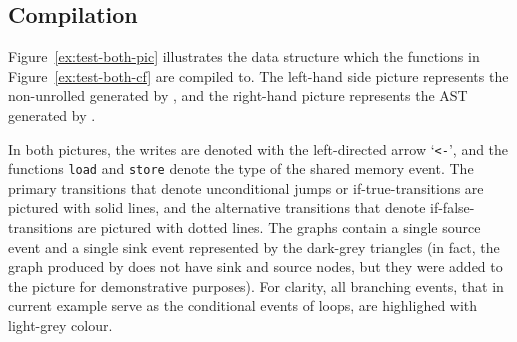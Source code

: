 \subsection{Compilation}
\label{ch:eval:show:compil}

Figure~\ref{ex:test-both-pic} illustrates the data structure which the functions in Figure~\ref{ex:test-both-cf} are compiled to.
The left-hand side picture represents the non-unrolled \xgraph[CF] generated by \porthos[2], and the right-hand picture represents the AST generated by \porthos[1].

In both pictures, the writes are denoted with the left-directed arrow `\lstinline{<-}', and the functions \lstinline{load} and \lstinline{store} denote the type of the shared memory event.
The primary transitions that denote unconditional jumps or if-true-transitions are pictured with solid lines, and the alternative transitions that denote if-false-transitions are pictured with dotted lines.
The graphs contain a single source event and a single sink event represented by the dark-grey triangles (in fact, the graph produced by \porthos[1] does not have sink and source nodes, but they were added to the picture for demonstrative purposes).
For clarity, all branching events, that in current example serve as the conditional events of loops, are highlighed with light-grey colour.

